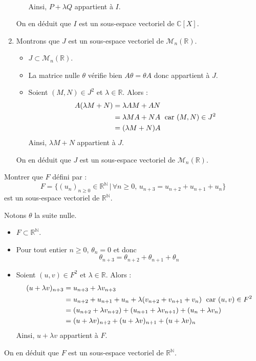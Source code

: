 \documentclass[a4paper,twoside,french,11pt]{VcCours}
\begin{document}
\begin{enumerate}
\begin{itemize}
\begin{align*}
\end{align*}
Ainsi, $P+ \lambda Q$ appartient à $I$.
\end{itemize}
On en déduit que $I$ est un sous-espace vectoriel de $\mathbb{C}[X]$.
\item Montrons que $J$ est un sous-espace vectoriel de $\mathcal{M}_n(\mathbb{R})$.
\begin{itemize}
\item $J \subset \mathcal{M}_n(\mathbb{R})$.
\item La matrice nulle $\theta$ vérifie bien $A \theta = \theta A$ donc appartient à $J$.
\item Soient $(M,N) \in J^2$ et $\lambda \in \mathbb{R}$. Alors :
\begin{align*}
A(\lambda M + N) & = \lambda AM + AN \\
& = \lambda MA + NA \; \hbox{ car } (M,N) \in J^2 \\
& = (\lambda M+N) A 
\end{align*}
Ainsi, $\lambda M +N$ appartient à $J$.
\end{itemize}
On en déduit que $J$ est un sous-espace vectoriel de $\mathcal{M}_n(\mathbb{R})$.
\end{enumerate}


\begin{Exercice}{} Montrer que $F$ défini par :
$$ F = \lbrace (u_n)_{n \geq 0} \in \mathbb{R}^{\mathbb{N}} \, \vert \, \forall n \geq 0, \, u_{n+3}=u_{n+2}+u_{n+1}+u_n \rbrace$$
est un sous-espace vectoriel de $\mathbb{R}^{\mathbb{N}}$.
\end{Exercice}

\corr Notons $\theta$ la suite nulle.

\begin{itemize}
\item $F \subset \mathbb{R}^{\mathbb{N}}$.
\item Pour tout entier $n \geq 0$, $\theta_n = 0$ et donc
$$ \theta_{n+3} = \theta_{n+2} + \theta_{n+1} + \theta_n$$
\item Soient $(u,v) \in F^2$ et $\lambda \in \mathbb{R}$. Alors :
\begin{align*}
(u+\lambda v)_{n+3} & = u_{n+3} + \lambda v_{n+3} \\
& = u_{n+2}+u_{n+1}+u_n + \lambda (v_{n+2}+v_{n+1}+v_n) \; \hbox{ car } (u,v) \in F^2 \\
& = (u_{n+2} + \lambda v_{n+2}) + (u_{n+1} + \lambda v_{n+1}) + (u_n + \lambda v_n) \\
& = (u+\lambda v)_{n+2} + (u+\lambda v)_{n+1} + (u+\lambda v)_{n}
\end{align*}
Ainsi, $u+ \lambda v$ appartient à $F$.
\end{itemize}
On en déduit que $F$ est un sous-espace vectoriel de $\mathbb{R}^{\mathbb{N}}$.
\end{document}
